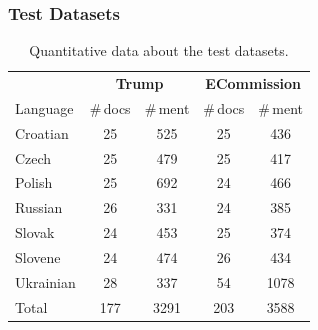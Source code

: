 \documentclass{beamer}
\begin{document}
\begin{frame}[fragile]
 \frametitle{Test Datasets}

\begin{table}
  \begin{center}
    \begin{footnotesize}
      \begin{tabular}{lcccc}
        \toprule 
        & \multicolumn{2}{c}{\textbf{{\sc Trump}}} & \multicolumn{2}{c}{\textbf{{\sc ECommission}}} \\
        \cmidrule(lr){2-3}
        \cmidrule(lr){4-5}
        Language &  \#\,docs & \#\,ment & \#\,docs & \#\,ment \\
        \midrule
        Croatian & 25 & 525 & 25 & 436 \\
        Czech & 25 & 479  & 25 & 417 \\
        Polish & 25 & 692  & 24 & 466 \\
        Russian & 26 & 331  & 24 & 385 \\
        Slovak  & 24 & 453  & 25 & 374 \\
        Slovene & 24 & 474  & 26 & 434 \\
        Ukrainian & 28 & 337  & 54 & 1078 \\
        \midrule
        Total & 177 & 3291  & 203 & 3588 \\

        \bottomrule
      \end{tabular}
    \end{footnotesize}
  \end{center}
	\caption{Quantitative data about the test datasets.}
\end{table}

\end{frame}
\end{document}
